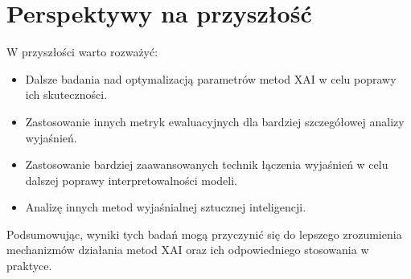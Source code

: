 \section*{Perspektywy na przyszłość}

W przyszłości warto rozważyć:
\begin{itemize}
	\item Dalsze badania nad optymalizacją parametrów metod XAI w celu poprawy ich skuteczności.
	\item Zastosowanie innych metryk ewaluacyjnych dla bardziej szczegółowej analizy wyjaśnień.
	\item Zastosowanie bardziej zaawansowanych technik łączenia wyjaśnień w celu dalszej poprawy interpretowalności modeli.
	\item Analizę innych metod wyjaśnialnej sztucznej inteligencji.
\end{itemize}

Podsumowując, wyniki tych badań mogą przyczynić się do lepszego zrozumienia mechanizmów działania metod XAI oraz ich odpowiedniego stosowania w praktyce.
